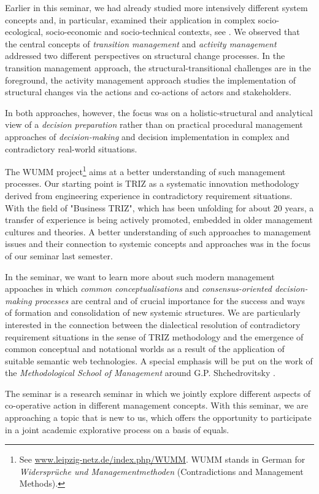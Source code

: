 \documentclass[11pt,a4paper]{article}
\begin{document}
Earlier in this seminar, we had already studied more intensively different
system concepts and, in particular, examined their application in complex
socio-ecological, socio-economic and socio-technical contexts, see
\cite{GraebeKleemann}. We observed that the central concepts of \emph{transition
  management} and \emph{activity management} addressed two different
perspectives on structural change processes. In the transition management
approach, the structural-transitional challenges are in the foreground, the
activity management approach studies the implementation of structural changes
via the actions and co-actions of actors and stakeholders.

In both approaches, however, the focus was on a holistic-structural and
analytical view of a \emph{decision preparation} rather than on practical
procedural management approaches of \emph{decision-making} and decision
implementation in complex and contradictory real-world situations.

The WUMM project\footnote{See \url{www.leipzig-netz.de/index.php/WUMM}. WUMM
  stands in German for \emph{Widersprüche und Managementmethoden}
  (Contradictions and Management Methods).} aims at a better understanding of
such management processes. Our starting point is TRIZ as a systematic
innovation methodology derived from engineering experience in contradictory
requirement situations. With the field of "Business TRIZ", which has been
unfolding for about 20 years, a transfer of experience is being actively
promoted, embedded in older management cultures and theories.  A better
understanding of such approaches to management issues and their connection to
systemic concepts and approaches was in the focus of our seminar last
semester.

In the seminar, we want to learn more about such modern management appoaches
in which \emph{common conceptualisations} and \emph{consensus-oriented
  decision-making processes} are central and of crucial importance for the
success and ways of formation and consolidation of new systemic structures.
We are particularly interested in the connection between the dialectical
resolution of contradictory requirement situations in the sense of TRIZ
methodology and the emergence of common conceptual and notational worlds as a
result of the application of suitable semantic web technologies.  A special
emphasis will be put on the work of the \emph{Methodological School of
  Management} around G.P. Shchedrovitsky \cite{MSM}.

The seminar is a research seminar in which we jointly explore different
aspects of co-operative action in different management concepts.  With this
seminar, we are approaching a topic that is new to us, which offers the
opportunity to participate in a joint academic explorative process on a basis
of equals. 
\end{document}
